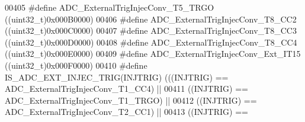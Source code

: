 \begin{DoxyCode}
00405 \textcolor{preprocessor}{#}\textcolor{preprocessor}{define} \textcolor{preprocessor}{ADC\_ExternalTrigInjecConv\_T5\_TRGO}           \textcolor{preprocessor}{(}\textcolor{preprocessor}{(}\textcolor{preprocessor}{uint32\_t}\textcolor{preprocessor}{)}0x000B0000\textcolor{preprocessor}{)}
00406 \textcolor{preprocessor}{#}\textcolor{preprocessor}{define} \textcolor{preprocessor}{ADC\_ExternalTrigInjecConv\_T8\_CC2}            \textcolor{preprocessor}{(}\textcolor{preprocessor}{(}\textcolor{preprocessor}{uint32\_t}\textcolor{preprocessor}{)}0x000C0000\textcolor{preprocessor}{)}
00407 \textcolor{preprocessor}{#}\textcolor{preprocessor}{define} \textcolor{preprocessor}{ADC\_ExternalTrigInjecConv\_T8\_CC3}            \textcolor{preprocessor}{(}\textcolor{preprocessor}{(}\textcolor{preprocessor}{uint32\_t}\textcolor{preprocessor}{)}0x000D0000\textcolor{preprocessor}{)}
00408 \textcolor{preprocessor}{#}\textcolor{preprocessor}{define} \textcolor{preprocessor}{ADC\_ExternalTrigInjecConv\_T8\_CC4}            \textcolor{preprocessor}{(}\textcolor{preprocessor}{(}\textcolor{preprocessor}{uint32\_t}\textcolor{preprocessor}{)}0x000E0000\textcolor{preprocessor}{)}
00409 \textcolor{preprocessor}{#}\textcolor{preprocessor}{define} \textcolor{preprocessor}{ADC\_ExternalTrigInjecConv\_Ext\_IT15}          \textcolor{preprocessor}{(}\textcolor{preprocessor}{(}\textcolor{preprocessor}{uint32\_t}\textcolor{preprocessor}{)}0x000F0000\textcolor{preprocessor}{)}
00410 \textcolor{preprocessor}{#}\textcolor{preprocessor}{define} \textcolor{preprocessor}{IS\_ADC\_EXT\_INJEC\_TRIG}\textcolor{preprocessor}{(}\textcolor{preprocessor}{INJTRIG}\textcolor{preprocessor}{)} \textcolor{preprocessor}{(}\textcolor{preprocessor}{(}\textcolor{preprocessor}{(}\textcolor{preprocessor}{INJTRIG}\textcolor{preprocessor}{)} \textcolor{preprocessor}{==} 
      ADC_ExternalTrigInjecConv_T1_CC4\textcolor{preprocessor}{)} \textcolor{preprocessor}{||}
00411                                         \textcolor{preprocessor}{(}\textcolor{preprocessor}{(}\textcolor{preprocessor}{INJTRIG}\textcolor{preprocessor}{)} \textcolor{preprocessor}{==} 
      ADC_ExternalTrigInjecConv_T1_TRGO\textcolor{preprocessor}{)} \textcolor{preprocessor}{||}
00412                                         \textcolor{preprocessor}{(}\textcolor{preprocessor}{(}\textcolor{preprocessor}{INJTRIG}\textcolor{preprocessor}{)} \textcolor{preprocessor}{==} 
      ADC_ExternalTrigInjecConv_T2_CC1\textcolor{preprocessor}{)} \textcolor{preprocessor}{||}
00413                                         \textcolor{preprocessor}{(}\textcolor{preprocessor}{(}\textcolor{preprocessor}{INJTRIG}\textcolor{preprocessor}{)} \textcolor{preprocessor}{==} 

\end{DoxyCode}
